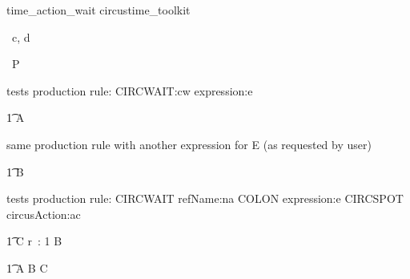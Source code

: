 \begin{zsection}
   \SECTION time\_action\_wait \parents circustime\_toolkit
\end{zsection}

\begin{circus}
   \circchannel\ c, d \\
\end{circus}

\begin{circus}
    \circprocess\ P \circdef \circbegin \\
\end{circus}

tests production rule: CIRCWAIT:cw expression:e
\begin{circusaction}
        \t1 A \circdef {}  \\
\end{circusaction} 

same production rule with another expression for E (as requested by user)
\begin{circusaction}
        \t1 B \circdef {}   \\
\end{circusaction} 

tests production rule: CIRCWAIT refName:na COLON expression:e CIRCSPOT circusAction:ac
\begin{circusaction}
        \t1 C \circdef \circwait r~: 1  \circspot B  \\
\end{circusaction} 
      
\begin{circusaction}
     \t1 \circspot A \circseq B \circseq C \\
\end{circusaction}



\begin{circus}
    \circend
\end{circus}


   